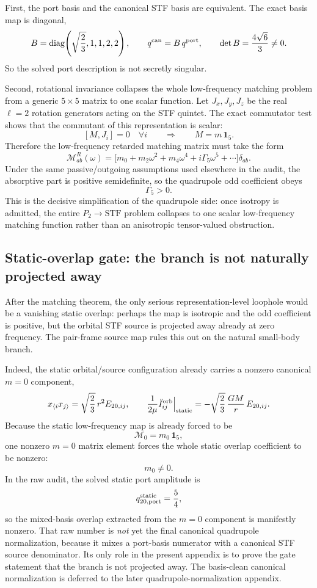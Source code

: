 \documentclass[11pt]{article}
\begin{document}
First, the port basis and the canonical STF basis are equivalent.  The exact
basis map is diagonal,
\[
B=\operatorname{diag}\!\left(\sqrt{\frac23},1,1,2,2\right),
\qquad
q^{\rm can}=B\,q^{\rm port},
\qquad
\det B=\frac{4\sqrt6}{3}\neq0.
\]
So the solved port description is not secretly singular.

Second, rotational invariance collapses the whole low-frequency matching problem
from a generic $5\times5$ matrix to one scalar function.  Let
\(J_x,J_y,J_z\) be the real $\ell=2$ rotation generators acting on the STF
quintet.  The exact commutator test shows that the commutant of this
representation is scalar:
\[
[M,J_i]=0\quad\forall i
\qquad\Longrightarrow\qquad
M=m\,\mathbf 1_5.
\]
Therefore the low-frequency retarded matching matrix must take the form
\[
\mathcal M_{ab}^R(\omega)
=
\bigl[m_0+m_2\omega^2+m_4\omega^4+i\Gamma_5\omega^5+\cdots\bigr]\delta_{ab}.
\]
Under the same passive/outgoing assumptions used elsewhere in the audit, the
absorptive part is positive semidefinite, so the quadrupole odd coefficient
obeys
\[
\Gamma_5>0.
\]
This is the decisive simplification of the quadrupole side: once isotropy is
admitted, the entire $P_2\to\mathrm{STF}$ problem collapses to one scalar
low-frequency matching function rather than an anisotropic tensor-valued
obstruction.

\subsection{Static-overlap gate: the branch is not naturally projected away}
\label{app:quad-ledger-static-overlap}

After the matching theorem, the only serious representation-level loophole would
be a vanishing static overlap: perhaps the map is isotropic and the odd
coefficient is positive, but the orbital STF source is projected away already at
zero frequency.  The pair-frame source map rules this out on the natural
small-body branch.

Indeed, the static orbital/source configuration already carries a nonzero
canonical $m=0$ component,
\[
x_{\langle i}x_{j\rangle}=\sqrt{\frac23}\,r^2E_{20,ij},
\qquad
\frac{1}{2\mu}\ddot I_{ij}^{\rm orb}\Big|_{\rm static}
=-\sqrt{\frac23}\,\frac{GM}{r}\,E_{20,ij}.
\]
Because the static low-frequency map is already forced to be
\[
\mathcal M_0=m_0\,\mathbf 1_5,
\]
one nonzero $m=0$ matrix element forces the whole static overlap coefficient to
be nonzero:
\[
\boxed{m_0\neq0.}
\]
In the raw audit, the solved static port amplitude is
\[
q_{20,\rm port}^{\rm static}=\frac54,
\]
so the mixed-basis overlap extracted from the $m=0$ component is manifestly
nonzero.  That raw number is \emph{not} yet the final canonical quadrupole
normalization, because it mixes a port-basis numerator with a canonical STF
source denominator.  Its only role in the present appendix is to prove the gate
statement that the branch is not projected away.  The basis-clean canonical
normalization is deferred to the later quadrupole-normalization appendix.
\end{document}
